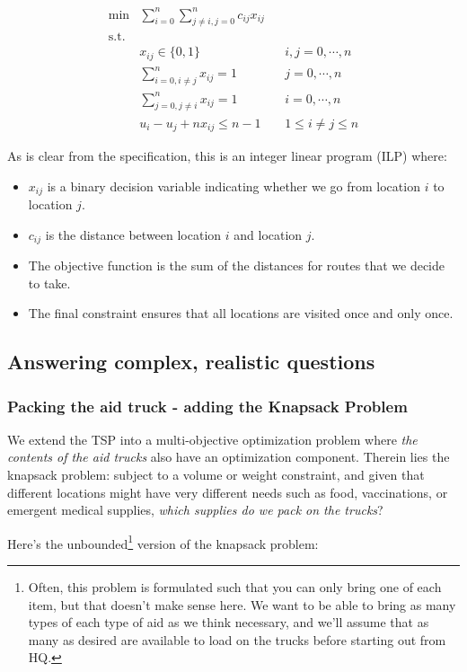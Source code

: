 \documentclass{article} %
\begin{document}
\begin{align*}
\min &\sum_{i=0}^n \sum_{j\ne i,j=0}^nc_{ij}x_{ij} &&  \\
\mathrm{s.t.} & \\
	& x_{ij} \in \{0, 1\} && i,j=0, \cdots, n \\
	& \sum_{i=0,i\ne j}^n x_{ij} = 1 && j=0, \cdots, n \\
	& \sum_{j=0,j\ne i}^n x_{ij} = 1 && i=0, \cdots, n \\
	&u_i-u_j +nx_{ij} \le n-1 && 1 \le i \ne j \le n
\end{align*}

As is clear from the specification, this is an integer linear program (ILP) where:

\begin{itemize}
  \item $x_{ij}$ is a binary decision variable indicating whether we go from location $i$ to location $j$.
  \item $c_{ij}$ is the distance between location $i$ and location $j$.
  \item The objective function is the sum of the distances for routes that we decide to take.
  \item The final constraint ensures that all locations are visited once and only once.
\end{itemize}

\subsection*{Answering complex, realistic questions}

\subsubsection*{Packing the aid truck - adding the Knapsack Problem}

We extend the TSP into a multi-objective optimization problem
where \emph{the contents of the aid trucks} also have an optimization component. Therein lies
the knapsack problem: subject to a volume or weight constraint, and given that different locations
might have very different needs such as food, vaccinations, or emergent medical supplies, \emph{which
supplies do we pack on the trucks}?

Here's the unbounded\footnote{Often, this problem is formulated such that you can only bring one of
each item, but that doesn't make sense here. We want to be able to bring as many types of each type
of aid as we think necessary, and we'll assume that as many as desired are available to load on the
trucks before starting out from HQ.} version of the knapsack problem:
\end{document}
